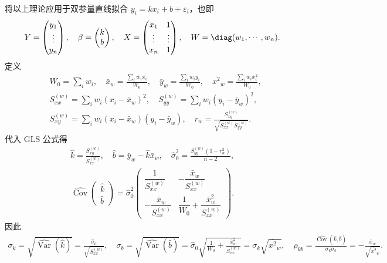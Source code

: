 将以上理论应用于双参量直线拟合 \(y_i=kx_i+b+\varepsilon_i\)，也即
\begin{align*}
	Y=\begin{pmatrix}y_1\\ \vdots\\ y_n\end{pmatrix},
	\quad \beta=\begin{pmatrix}k\\ b\end{pmatrix},
	\quad X=\begin{pmatrix}x_1&1\\ \vdots&\vdots\\ x_n&1\end{pmatrix},
	\quad W=\diag(w_1,\cdots,w_n).
\end{align*}
定义
\begin{align*}
	&W_0=\sum_iw_i,
	\quad \bar{x}_w=\frac{\sum_iw_ix_i}{W_0},
	\quad \bar{y}_w=\frac{\sum_iw_iy_i}{W_0},
	\quad \overline{x^2}_w=\frac{\sum_iw_ix_i^2}{W_0},\\
	&S_{xx}^{(w)}=\sum_iw_i(x_i-\bar{x}_w)^2,
	\quad S_{yy}^{(w)}=\sum_iw_i(y_i-\bar{y}_w)^2,\\
	&S_{xy}^{(w)}=\sum_iw_i(x_i-\bar{x}_w)(y_i-\bar{y}_w),
	\quad r_w=\frac{S_{xy}^{(w)}}{\sqrt{S_{xx}^{(w)}S_{yy}^{(w)}}}.
\end{align*}
代入 GLS 公式得
\begin{align*}
	\hat{k}=\frac{S_{xy}^{(w)}}{S_{xx}^{(w)}},
	\quad \hat{b}=\bar{y}_w-\hat{k}\bar{x}_w,
	\quad \hat{\sigma}_0^2=\frac{S_{yy}^{(w)}(1-r_w^2)}{n-2},
\end{align*}
\begin{align*}
	\widehat{\operatorname{Cov}}\begin{pmatrix}\hat{k}\\ \hat{b}\end{pmatrix}
	=\hat{\sigma}_0^2
	\begin{pmatrix}
		\dfrac{1}{S_{xx}^{(w)}}&-\dfrac{\bar{x}_w}{S_{xx}^{(w)}}\\[8pt]
		-\dfrac{\bar{x}_w}{S_{xx}^{(w)}}&\dfrac{1}{W_0}+\dfrac{\bar{x}_w^2}{S_{xx}^{(w)}}
	\end{pmatrix}.
\end{align*}
因此
\begin{align*}
	\sigma_k=\sqrt{\widehat{\operatorname{Var}}(\hat{k})}
	=\frac{\hat{\sigma}_0}{\sqrt{S_{xx}^{(w)}}},
	\quad
	\sigma_b=\sqrt{\widehat{\operatorname{Var}}(\hat{b})}
	=\hat{\sigma}_0\sqrt{\frac{1}{W_0}+\frac{\bar{x}_w^2}{S_{xx}^{(w)}}}
	=\sigma_k\sqrt{\overline{x^2}_w},\quad
	\rho_{kb}=\frac{\widehat{\operatorname{Cov}}(\hat{k},\hat{b})}{\sigma_k\sigma_b}
	=-\frac{\bar{x}_w}{\sqrt{\overline{x^2}_w}}.
\end{align*}
